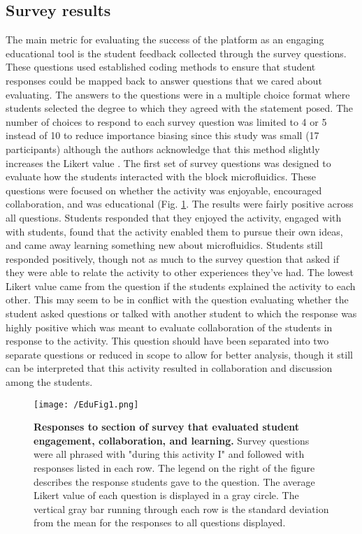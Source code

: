 \subsection{Survey results}
The main metric for evaluating the success of the platform as an engaging educational tool is the student feedback collected through the survey questions. These questions used established coding methods to ensure that student responses could be mapped back to answer questions that we cared about evaluating. The answers to the questions were in a multiple choice format where students selected the degree to which they agreed with the statement posed. The number of choices to respond to each survey question was limited to 4 or 5 instead of 10 to reduce importance biasing since this study was small (17 participants) although the authors acknowledge that this method slightly increases the Likert value \cite{ISI:000252619600006}.
The first set of survey questions was designed to evaluate how the students interacted with the block microfluidics. These questions were focused on whether the activity was enjoyable, encouraged collaboration, and was educational (Fig. \ref{figure:EduFig1}. The results were fairly positive across all questions. Students responded that they enjoyed the activity, engaged with with students, found that the activity enabled them to pursue their own ideas, and came away learning something new about microfluidics. Students still responded positively, though not as much to the survey question that asked if they were able to relate the activity to other experiences they've had. The lowest Likert value came from the question if the students explained the activity to each other. This may seem to be in conflict with the question evaluating whether the student asked questions or talked with another student to which the response was highly positive which was meant to evaluate collaboration of the students in response to the activity. This question should have been separated into two separate questions or reduced in scope to allow for better analysis, though it still can be interpreted that this activity resulted in collaboration and discussion among the students. 

\begin{figure}[h!] %
\centering
\texttt{[image: /EduFig1.png]}
\caption{\textbf{Responses to section of survey that evaluated student engagement, collaboration, and learning.} Survey questions were all phrased with "during this activity I" and followed with responses listed in each row. The legend on the right of the figure describes the response students gave to the question. The average Likert value of each question is displayed in a gray circle. The vertical gray bar running through each row is the standard deviation from the mean for the responses to all questions displayed.}
\label{figure:EduFig1}
\end{figure}
\FloatBarrier

